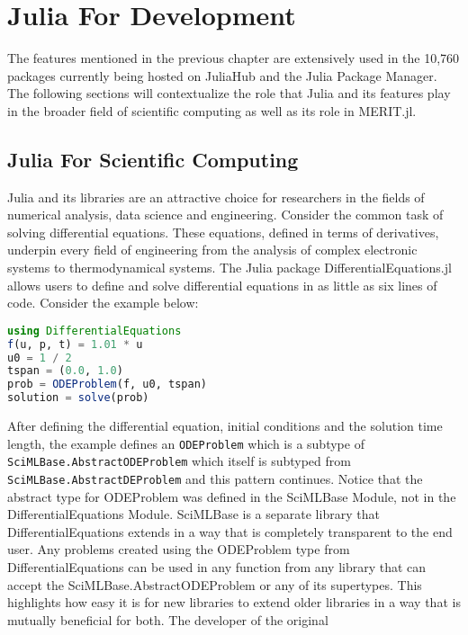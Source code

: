\setcounter{chapter}{3}
\setcounter{section}{0}
\setcounter{subsection}{0}

\chapter*{Julia For Development}
The features mentioned in the previous chapter are extensively used in the 10,760 packages currently being hosted on
JuliaHub and the Julia Package Manager. The following sections will contextualize the role that Julia and its features
play in the broader field of scientific computing as well as its role in MERIT.jl. 

\section{Julia For Scientific Computing}
\label{JuliaScientificComputing}
Julia and its libraries are an attractive choice for researchers in the fields of numerical analysis, data science and
engineering. Consider the common task of solving differential equations. These equations, defined in terms of
derivatives, underpin every field of engineering from the analysis of complex electronic systems to thermodynamical
systems. The Julia package DifferentialEquations.jl \cite{rackauckas2017differentialequations} allows users to define
and solve differential equations in as little as six lines of code. Consider the example below:
\begin{lstlisting}[language=Julia]
using DifferentialEquations
f(u, p, t) = 1.01 * u
u0 = 1 / 2
tspan = (0.0, 1.0)
prob = ODEProblem(f, u0, tspan)
solution = solve(prob)
\end{lstlisting}
After defining the differential equation, initial conditions and the solution time length, the example defines an
\lstinline[language=Julia]{ODEProblem} which is a subtype of \lstinline[language=Julia]{SciMLBase.AbstractODEProblem}
which itself is subtyped from \lstinline[language=Julia]{SciMLBase.AbstractDEProblem} and this pattern continues. Notice
that the abstract type for ODEProblem was defined in the SciMLBase Module, not in the DifferentialEquations Module.
SciMLBase is a separate library that DifferentialEquations extends in a way that is completely transparent to the end
user. Any problems created using the ODEProblem type from DifferentialEquations can be used in any function from any
library that can accept the SciMLBase.AbstractODEProblem or any of its supertypes. This highlights how easy it is for
new libraries to extend older libraries in a way that is mutually beneficial for both. The developer of the original
